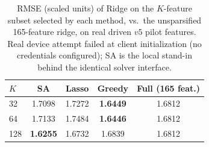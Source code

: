 \begin{table}[t]
\centering\footnotesize
\begin{tabular}{lcccc}
\toprule
$K$ & SA & Lasso & Greedy & Full (165 feat.) \\
\midrule
32 & 1.7098 & 1.7272 & \textbf{1.6449} & 1.6812 \\
64 & 1.7133 & 1.7484 & \textbf{1.6446} & 1.6812 \\
128 & \textbf{1.6255} & 1.6732 & 1.6839 & 1.6812 \\
\bottomrule
\end{tabular}
\caption{RMSE (scaled units) of Ridge on the $K$-feature subset selected by each method, vs.\ the unsparsified 165-feature ridge, on real driven $v5$ pilot features. Real device attempt failed at client initialization (no credentials configured); SA is the local stand-in behind the identical solver interface.}
\label{tab:dirac3}
\end{table}
